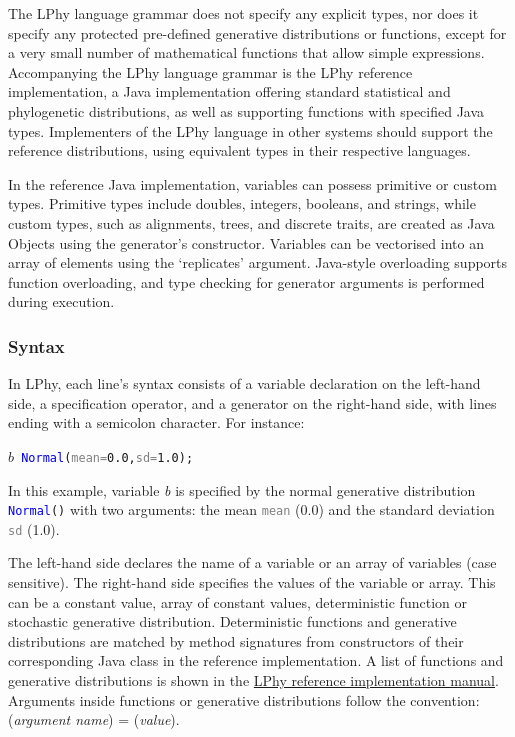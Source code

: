\documentclass[10pt,letterpaper,table]{article}
\theoremstyle{definition}
\begin{document}
The LPhy language grammar does not specify any explicit types, nor does it specify any protected pre-defined generative distributions or functions, except for a very small number of mathematical functions that allow simple expressions. 
Accompanying the LPhy language grammar is the LPhy reference implementation, a Java implementation offering standard statistical and phylogenetic distributions, as well as supporting functions with specified Java types.
Implementers of the LPhy language in other systems should support the reference distributions, using equivalent types in their respective languages.

In the reference Java implementation, variables can possess primitive or custom types. 
Primitive types include doubles, integers, booleans, and strings, while custom types, such as alignments, trees, and discrete traits, are created as Java Objects using the generator's constructor. 
Variables can be vectorised into an array of elements using the `replicates' argument. 
Java-style overloading supports function overloading, and type checking for generator arguments is performed during execution.


\subsubsection{Syntax}
In LPhy, each line's syntax consists of a variable declaration on the left-hand side, a specification operator, and a generator on the right-hand side, with lines ending with a semicolon character. 
For instance:
{
  \small
  \begin{listing}
    \begin{alltt}
    \textcolor{bluishgreen}{\(b\)}  ~ \textcolor{blue}{Normal}(\textcolor{gray}{mean=} \textcolor{constant}{0.0}, \textcolor{gray}{sd=}\textcolor{constant}{1.0});
    \end{alltt}
  \end{listing}
}

In this example, variable \textit{\textcolor{bluishgreen}{b}} is specified by the normal generative distribution \texttt{\textcolor{blue}{Normal}()} with two arguments: the mean \texttt{\textcolor{gray}{mean}} (0.0) and the standard deviation \texttt{\textcolor{gray}{sd}} (1.0).

The left-hand side declares the name of a variable or an array of variables (case sensitive).
The right-hand side specifies the values of the variable or array. 
This can be a constant value, array of constant values, deterministic function or stochastic generative distribution.
Deterministic functions and generative distributions are matched by method signatures from constructors of their corresponding Java class in the reference implementation. 
A list of functions and generative distributions is shown in the \href{https://github.com/LinguaPhylo/linguaPhylo/blob/master/lphy/doc/index.md}{LPhy reference implementation manual}.
Arguments inside functions or generative distributions follow the convention: 
(\textit{argument name}) = (\textit{value}).
\end{document}
